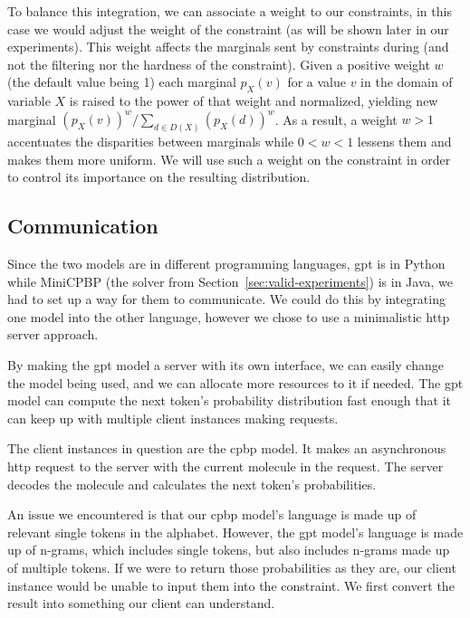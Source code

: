 \documentclass[../Document.tex]{subfiles}
\begin{document}
To balance this integration, we can associate a weight to our constraints, in this case we would adjust the weight of the \oracle constraint (as will be shown later in our experiments).
This weight affects the marginals sent by constraints during \bp (and not the filtering nor the hardness of the constraint).
Given a positive weight $w$ (the default value being 1) each marginal $p_X(v)$ for a value $v$ in the domain of variable $X$ is raised to the power of that weight and normalized, yielding new marginal $(p_X(v))^w / \sum_{d \in D(X)} (p_X(d))^w$.
As a result, a weight $w>1$ accentuates the disparities between marginals
while $0 < w < 1$ lessens them and makes them more uniform.
We will use such a weight on the \oracle constraint in order to control its importance on the resulting distribution.


\subsection{Communication}
\label{sec:cpgpt/communication}
Since the two models are in different programming languages, \gls{gpt} is in Python while MiniCPBP (the solver from Section~\ref{sec:valid-experiments}) is in Java, we had to set up a way for them to communicate.
We could do this by integrating one model into the other language, however we chose to use a minimalistic \gls{http} server approach.

By making the \gls{gpt} model a server with its own interface, we can easily change the model being used, and we can allocate more resources to it if needed.
The \gls{gpt} model can compute the next token's probability distribution fast enough that it can keep up with multiple client instances making requests.

The client instances in question are the \gls{cpbp} model. It makes an asynchronous \gls{http} request to the server with the current molecule in the request. The server decodes the molecule and calculates the next token's probabilities.

An issue we encountered is that our \gls{cpbp} model's language is made up of relevant single tokens in the \smiles alphabet.
However, the \gls{gpt} model's language is made up of n-grams, which includes single tokens, but also includes n-grams made up of multiple tokens.
If we were to return those probabilities as they are, our client instance would be unable to input them into the \oracle constraint.
We first convert the result into something our client can understand.
\end{document}
